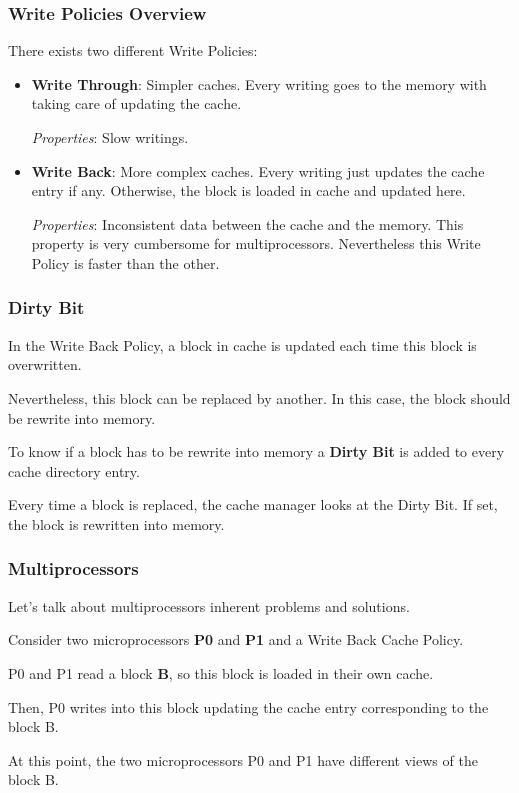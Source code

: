 
\begin{frame}
  \frametitle{Write Policies Overview}

  There exists two different Write Policies:

  \begin{itemize}[<+->]
    \item
      \textbf{Write Through}: Simpler caches. Every writing goes to the
      memory with taking care of updating the cache.

      \textit{Properties}: Slow writings.
    \item
      \textbf{Write Back}: More complex caches. Every writing just updates
      the cache entry if any. Otherwise, the block is loaded in cache
      and updated here.

      \textit{Properties}: Inconsistent data between the cache and the memory.
      This property is very cumbersome for multiprocessors. Nevertheless this
      Write Policy is faster than the other.
  \end{itemize}
\end{frame}


\begin{frame}
  \frametitle{Dirty Bit}

  In the Write Back Policy, a block in cache is updated each time this
  block is overwritten.

  \-

  Nevertheless, this block can be replaced by another. In this case, the
  block should be rewrite into memory.

  \-

  To know if a block has to be rewrite into memory a \textbf{Dirty Bit} is
  added to every cache directory entry.

  \-

  Every time a block is replaced, the cache manager looks at the Dirty Bit.
  If set, the block is rewritten into memory.
\end{frame}


\begin{frame}
  \frametitle{Multiprocessors}

  Let's talk about multiprocessors inherent problems and solutions.

  \-

  Consider two microprocessors \textbf{P0} and \textbf{P1} and a Write
  Back Cache Policy.

  \-

  P0 and P1 read a block \textbf{B}, so this block is loaded in their
  own cache.

  \-

  Then, P0 writes into this block updating the cache entry corresponding to
  the block B.

  \-

  At this point, the two microprocessors P0 and P1 have different
  views of the block B.
\end{frame}

